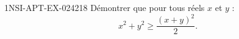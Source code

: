 \begin{exercice}{1NSI-APT-EX-024}{2}{18}
Démontrer que pour tous réels $x$ et $y$ :
\[ x^2 + y^2 \geq \frac{(x+y)^2}{2}. \]

\end{exercice}
